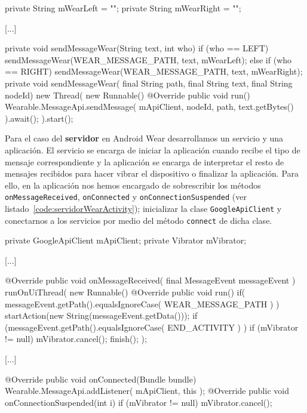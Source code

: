\begin{definitionlist}
\begin{listing}[
  float=ht,
  language = java,
  caption  = {Métodos utilizados para enviar mensajes por bluetooth haciendo uso de los Play
               Services},
  label    = code:sendMessageWear]
private String mWearLeft = "";
private String mWearRight = "";

[...]

private void sendMessageWear(String text, int who) {
    if (who == LEFT) {
        sendMessageWear(WEAR_MESSAGE_PATH, text, mWearLeft);
    }else if (who == RIGHT) {
        sendMessageWear(WEAR_MESSAGE_PATH, text, mWearRight);
    }
}
private void sendMessageWear( final String path, final String text, final String nodeId) {
    new Thread( new Runnable() {
        @Override
        public void run() {
            Wearable.MessageApi.sendMessage(
              mApiClient, nodeId, path, text.getBytes() ).await();
        }
    }).start();
}
\end{listing}

    Para el caso del \textbf{servidor} en Android Wear desarrollamos un servicio y una
    aplicación. El servicio se encarga de iniciar la aplicación cuando recibe el tipo de mensaje
    correspondiente y la aplicación se encarga de interpretar el resto de mensajes recibidos para
    hacer vibrar el dispositivo o finalizar la aplicación. Para ello, en la aplicación nos hemos
    encargado de sobrescribir los métodos \texttt{onMessageReceived}, \texttt{onConnected} y
    \texttt{onConnectionSuspended} (ver listado~\ref{code:servidorWearActivity}); inicializar la
    clase \texttt{GoogleApiClient} y conectarnos a los servicios por medio del método
    \texttt{connect} de dicha clase.

\begin{listing}[
  float=ht,
  language = java,
  caption  = {Métodos utilizados en los servidores para leer los mensajes recibidos por medio de los
              Play Services },
  label    = code:servidorWearActivity]
private GoogleApiClient mApiClient;
private Vibrator mVibrator;
    
[...]

@Override
public void onMessageReceived( final MessageEvent messageEvent ) {
    runOnUiThread( new Runnable() {
        @Override
        public void run() {
            if( messageEvent.getPath().equalsIgnoreCase( WEAR_MESSAGE_PATH ) ) {
                startAction(new String(messageEvent.getData()));
            }
            if (messageEvent.getPath().equalsIgnoreCase( END_ACTIVITY ) ) {
                if (mVibrator != null) {
                    mVibrator.cancel();
                }
                finish();
            }
        }
    });
}
    
[...]
    
@Override
public void onConnected(Bundle bundle) {
    Wearable.MessageApi.addListener( mApiClient, this );
}
@Override
public void onConnectionSuspended(int i) {
    if (mVibrator != null) {
        mVibrator.cancel();
    }
}
\end{listing}

\end{definitionlist}

